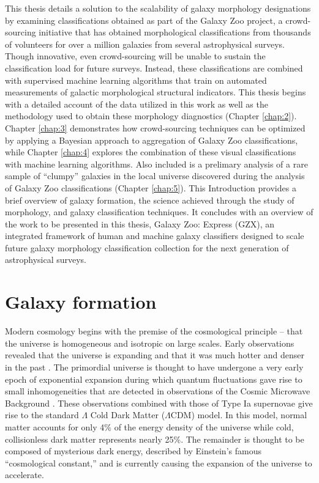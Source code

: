 This thesis details a solution to the scalability of galaxy morphology designations by examining classifications obtained as part of the Galaxy Zoo project, a crowd-sourcing initiative that has obtained morphological classifications from thousands of volunteers for over a million galaxies from several astrophysical surveys. Though innovative, even crowd-sourcing will be unable to sustain the classification load for future surveys. Instead, these classifications are combined with supervised machine learning algorithms that train on automated measurements of galactic morphological structural indicators. This thesis begins with a detailed account of the data utilized in this work as well as the methodology used to obtain these morphology diagnostics (Chapter \ref{chap:2}). Chapter \ref{chap:3} demonstrates how crowd-sourcing techniques can be optimized by applying a Bayesian approach to aggregation of Galaxy Zoo classifications, while Chapter \ref{chap:4} explores the combination of these visual classifications with machine learning algorithms. Also included is a prelimary analysis of a rare sample of ``clumpy'' galaxies in the local universe discovered during the analysis of Galaxy Zoo classifications (Chapter \ref{chap:5}). This Introduction provides a brief overview of galaxy formation, the science achieved through the study of morphology, and galaxy classification techniques. It concludes with an overview of the work to be presented in this thesis, Galaxy Zoo: Express (GZX), an integrated framework of human and machine galaxy classifiers designed to scale future galaxy morphology classification collection for the next generation of astrophysical surveys. 


\section{Galaxy formation}
Modern cosmology begins with the premise of the cosmological principle -- that the universe is homogeneous and isotropic on large scales. Early observations revealed that the universe is expanding \citep{Hubble1929,Hubble1931} and that it was much hotter and denser in the past \citep{Penzias1965,Dicke1965}.  The primordial universe is thought to have undergone a very early epoch of exponential expansion \citep{Guth1981} during which quantum fluctuations gave rise to small inhomogeneities that are detected in observations of the Cosmic Microwave Background \citep{Hinshaw2013,Planck2016}. These observations combined with those of Type Ia supernovae \citep{Riess1998,Perlmutter1998} give rise to the standard $\Lambda$ Cold Dark Matter ($\Lambda$CDM) model. In this model, normal matter accounts for only 4\% of the energy density of the universe while cold, collisionless dark matter represents nearly 25\%. The remainder is thought to be composed of mysterious dark energy, described by Einstein's famous ``cosmological constant,'' and is currently causing the expansion of the universe to accelerate.


